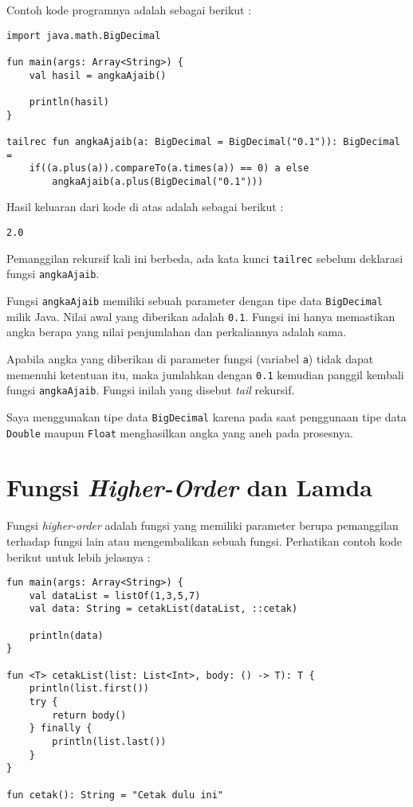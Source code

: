 Contoh kode programnya adalah sebagai berikut :

\begin{lstlisting}
import java.math.BigDecimal

fun main(args: Array<String>) {
	val hasil = angkaAjaib()
	
	println(hasil)
}

tailrec fun angkaAjaib(a: BigDecimal = BigDecimal("0.1")): BigDecimal =
	if((a.plus(a)).compareTo(a.times(a)) == 0) a else 
		angkaAjaib(a.plus(BigDecimal("0.1")))
\end{lstlisting}

Hasil keluaran dari kode di atas adalah sebagai berikut :

\begin{lstlisting}
2.0
\end{lstlisting}

Pemanggilan rekursif kali ini berbeda, ada kata kunci \texttt{tailrec} sebelum deklarasi fungsi \texttt{angkaAjaib}.

Fungsi \texttt{angkaAjaib} memiliki sebuah parameter dengan tipe data \texttt{BigDecimal} milik Java. Nilai awal yang diberikan adalah \texttt{0.1}. Fungsi ini hanya memastikan angka berapa yang nilai penjumlahan dan perkaliannya adalah sama.

Apabila angka yang diberikan di parameter fungsi (variabel \texttt{a}) tidak dapat memenuhi ketentuan itu, maka jumlahkan dengan \texttt{0.1} kemudian panggil kembali fungsi \texttt{angkaAjaib}. Fungsi inilah yang disebut \textit{tail} rekursif.

Saya menggunakan tipe data \texttt{BigDecimal} karena pada saat penggunaan tipe data \texttt{Double} maupun \texttt{Float} menghasilkan angka yang aneh pada prosesnya.

\section{Fungsi \textit{Higher-Order} dan Lamda}

Fungsi \textit{higher-order} adalah fungsi yang memiliki parameter berupa pemanggilan terhadap fungsi lain atau mengembalikan sebuah fungsi. Perhatikan contoh kode berikut untuk lebih jelasnya  :

\begin{lstlisting}
fun main(args: Array<String>) {
	val dataList = listOf(1,3,5,7)
	val data: String = cetakList(dataList, ::cetak)
	
	println(data)
}

fun <T> cetakList(list: List<Int>, body: () -> T): T {
	println(list.first())
	try {
		return body()
	} finally {
		println(list.last())
	}
}

fun cetak(): String = "Cetak dulu ini"
\end{lstlisting}

